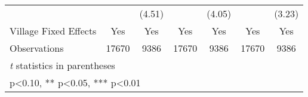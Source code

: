 \begin{table}[htbp]
\begin{tabular}{l*{6}{c}}
                &            &   (4.51)   &            &   (4.05)   &            &   (3.23)   \\
Village Fixed Effects&      Yes   &      Yes   &      Yes   &      Yes   &      Yes   &      Yes   \\
\midrule
Observations    &    17670   &     9386   &    17670   &     9386   &    17670   &     9386   \\
\bottomrule
\multicolumn{7}{l}{\footnotesize \textit{t} statistics in parentheses}\\
\multicolumn{7}{l}{\footnotesize * p<0.10, ** p<0.05, *** p<0.01}\\
\end{tabular}
\end{table}
